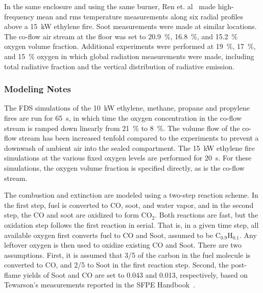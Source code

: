 In the same enclosure and using the same burner, Ren et. al~\cite{Ren:IAFSS2020} made high-frequency mean and rms temperature measurements along six radial profiles above a 15~kW ethylene fire. Soot measurements were made at similar locations. The co-flow air stream at the floor was set to 20.9~\%, 16.8~\%, and 15.2~\% oxygen volume fraction. Additional experiments were performed at 19~\%, 17~\%, and 15~\% oxygen in which global radiation measurements were made, including total radiative fraction and the vertical distribution of radiative emission.

\subsubsection{Modeling Notes}

The FDS simulations of the 10~kW ethylene, methane, propane and propylene fires are run for 65~s, in which time the oxygen concentration in the co-flow stream is ramped down linearly from 21~\% to 8~\%. The volume flow of the co-flow stream has been increased tenfold compared to the experiments to prevent a downwash of ambient air into the sealed compartment. The 15~kW ethylene fire simulations at the various fixed oxygen levels are performed for 20~s. For these simulations, the oxygen volume fraction is specified directly, as is the co-flow stream.

The combustion and extinction are modeled using a two-step reaction scheme. In the first step, fuel is converted to CO, soot, and water vapor, and in the second step, the CO and soot are oxidized to form CO$_2$. Both reactions are fast, but the oxidation step follows the first reaction in serial. That is, in a given time step, all available oxygen first converts fuel to CO and Soot, assumed to be C$_{0.9}$H$_{0.1}$. Any leftover oxygen is then used to oxidize existing CO and Soot. There are two assumptions. First, it is assumed that 3/5 of the carbon in the fuel molecule is converted to CO, and 2/5 to Soot in the first reaction step. Second, the post-flame yields of Soot and CO are set to 0.043 and 0.013, respectively, based on Tewarson's measurements reported in the SFPE Handbook~\cite{SFPE:Tewarson}.

